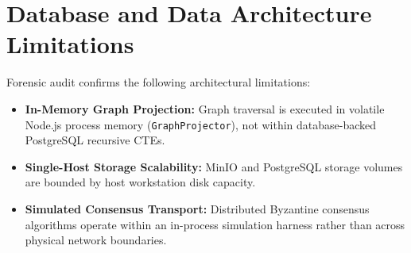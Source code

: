 \section{Database and Data Architecture Limitations}
\label{sec:data-limitations}
Forensic audit confirms the following architectural limitations:
\begin{itemize}
    \item \textbf{In-Memory Graph Projection:} Graph traversal is executed in volatile Node.js process memory (\texttt{GraphProjector}), not within database-backed PostgreSQL recursive CTEs.
    \item \textbf{Single-Host Storage Scalability:} MinIO and PostgreSQL storage volumes are bounded by host workstation disk capacity.
    \item \textbf{Simulated Consensus Transport:} Distributed Byzantine consensus algorithms operate within an in-process simulation harness rather than across physical network boundaries.
\end{itemize}
